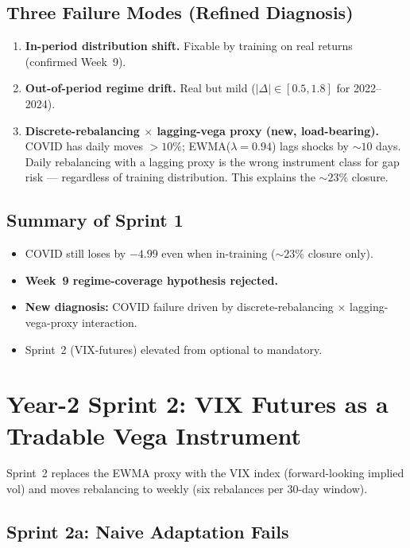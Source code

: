\documentclass[11pt, a4paper]{article}
\begin{document}
\subsection{Three Failure Modes (Refined Diagnosis)}

\begin{enumerate}
\item \textbf{In-period distribution shift.} Fixable by training on real returns (confirmed Week~9).
\item \textbf{Out-of-period regime drift.} Real but mild ($|\Delta| \in [0.5, 1.8]$ for 2022--2024).
\item \textbf{Discrete-rebalancing $\times$ lagging-vega proxy (new, load-bearing).}
COVID has daily moves $>10\%$; EWMA($\lambda=0.94$) lags shocks by $\sim 10$ days.
Daily rebalancing with a lagging proxy is the wrong instrument class for gap risk ---
regardless of training distribution. This explains the $\sim 23\%$ closure.
\end{enumerate}

\subsection{Summary of Sprint 1}
\begin{itemize}
\item COVID still loses by $-4.99$ even when in-training ($\sim 23\%$ closure only).
\item \textbf{Week~9 regime-coverage hypothesis rejected.}
\item \textbf{New diagnosis:} COVID failure driven by discrete-rebalancing $\times$
      lagging-vega-proxy interaction.
\item Sprint~2 (VIX-futures) elevated from optional to mandatory.
\end{itemize}


\section{Year-2 Sprint 2: VIX Futures as a Tradable Vega Instrument}
\label{sec:sprint2}

Sprint~2 replaces the EWMA proxy with the VIX index (forward-looking implied vol)
and moves rebalancing to weekly (six rebalances per 30-day window).

\subsection{Sprint 2a: Naive Adaptation Fails}
\end{document}
